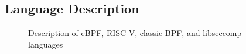\begin{appendix}

\section{Language Description}

\begin{figure}
  \centering
  \resizebox{\linewidth}{!}{
  }
  \vspace{-.5em}
  

  \centering
  \resizebox{\linewidth}{!}{
  }
  \vspace{-.5em}
  

  \centering
  \resizebox{\linewidth}{!}{
  }
  \vspace{-.5em}
  

  \centering
  \resizebox{\linewidth}{!}{
  }
  \vspace{-.5em}
  
  \caption{Description of eBPF, RISC-V, classic BPF, and libseccomp languages}
  \label{fig:lang}
\end{figure}


\end{appendix}